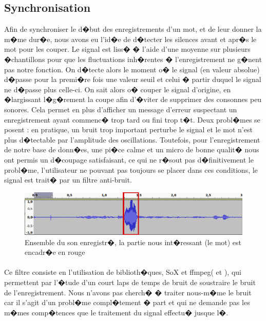     \subsection{Synchronisation}
	Afin de synchroniser le d�but des enregistrements d'un mot, et de leur donner la m�me dur�e, nous avons eu l'id�e de d�tecter les silences avant et apr�s le mot pour les couper. 
	Le signal est liss� � l'aide d'une moyenne sur plusieurs �chantillons pour que les fluctuations inh�rentes � l'enregistrement ne g�nent pas notre fonction. 
	On d�tecte alors le moment o� le signal (en valeur absolue) d�passe pour la premi�re fois une valeur seuil et celui � partir duquel le signal ne d�passe plus celle-ci. 
	On sait alors o� couper le signal d'origine, en �largissant l�g�rement la coupe afin d'�viter de supprimer des consonnes peu sonores. 
	Cela permet en plus d'afficher un message d'erreur suspectant un enregistrement ayant commenc� trop tard ou fini trop t�t.
	Deux probl�mes se posent : en pratique, un bruit trop important perturbe le signal et le mot n'est plus d�tectable par l'amplitude des oscillations. 
	Toutefois, pour l'enregistrement de notre base de donn�es, une pi�ce calme et un micro de bonne qualit� nous ont permis un d�coupage satisfaisant, 
	ce qui ne r�sout pas d�finitivement le probl�me, l'utilisateur ne pouvant pas toujours se placer dans ces conditions, le signal est trait� par un filtre anti-bruit.
\begin{figure}[H]
    \begin{center}
	    \includegraphics[width=17cm]{Images/synchro.png} 
    \end{center}
    \caption{Ensemble du son enregistr�, la partie nous int�ressant (le mot) est encadr�e en rouge}
\end{figure}
\paragraph{}
	Ce filtre consiste en l'utilisation de biblioth�ques, SoX et ffmpeg(\cite{noisereduction} et \cite{sox}), qui permettent par l'�tude d'un court laps de temps de bruit de soustraire le bruit de l'enregistrement. 
	Nous n'avons pas cherch� � traiter nous-m�me le bruit car il s'agit d'un probl�me compl�tement � part et qui ne demande pas les m�mes comp�tences que le traitement du signal effectu� jusque l�.
